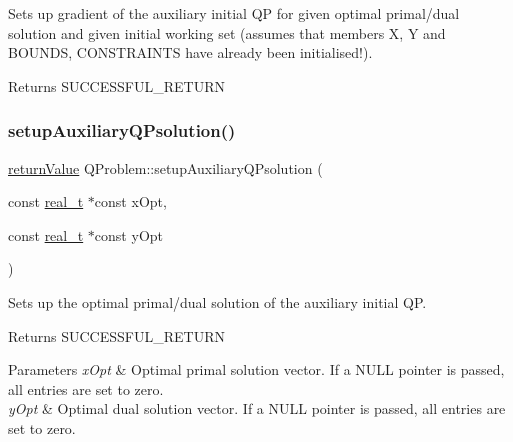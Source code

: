 Sets up gradient of the auxiliary initial QP for given optimal primal/dual solution and given initial working set (assumes that members X, Y and B\+O\+U\+N\+DS, C\+O\+N\+S\+T\+R\+A\+I\+N\+TS have already been initialised!). \begin{DoxyReturn}{Returns}
S\+U\+C\+C\+E\+S\+S\+F\+U\+L\+\_\+\+R\+E\+T\+U\+RN 
\end{DoxyReturn}
\mbox{\label{class_q_problem_a393d3526ea02bb6ec26896c857f70bb6}} 
\subsubsection{\texorpdfstring{setup\+Auxiliary\+Q\+Psolution()}{setupAuxiliaryQPsolution()}}
{\footnotesize\ttfamily \hyperlink{_message_handling_8hpp_a81d556f613bfbabd0b1f9488c0fa865e}{return\+Value} Q\+Problem\+::setup\+Auxiliary\+Q\+Psolution (\begin{DoxyParamCaption}\item[{const \hyperlink{qp_o_a_s_e_s__wrapper_8h_a0d00e2b3dfadee81331bbb39068570c4}{real\+\_\+t} $\ast$const}]{x\+Opt,  }\item[{const \hyperlink{qp_o_a_s_e_s__wrapper_8h_a0d00e2b3dfadee81331bbb39068570c4}{real\+\_\+t} $\ast$const}]{y\+Opt }\end{DoxyParamCaption})\hspace{0.3cm}{\ttfamily [protected]}}

Sets up the optimal primal/dual solution of the auxiliary initial QP. \begin{DoxyReturn}{Returns}
S\+U\+C\+C\+E\+S\+S\+F\+U\+L\+\_\+\+R\+E\+T\+U\+RN 
\end{DoxyReturn}

\begin{DoxyParams}{Parameters}
{\em x\+Opt} & Optimal primal solution vector. If a N\+U\+LL pointer is passed, all entries are set to zero. \\
\hline
{\em y\+Opt} & Optimal dual solution vector. If a N\+U\+LL pointer is passed, all entries are set to zero. \\
\hline
\end{DoxyParams}
\mbox{\label{class_q_problem_a1779e923a5f84cdddd33bbe38735f58c}} 
